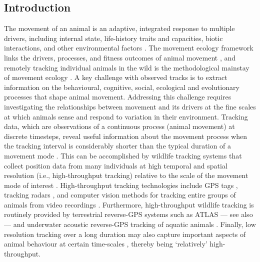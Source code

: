 \clearpage

\begin{refsection}
    \section{Introduction}
    The movement of an animal is an adaptive, integrated response to multiple drivers, including internal state, life-history traits and capacities, biotic interactions, and other environmental factors \cite{nathan2008a, holyoak2008}.
    The movement ecology framework links the drivers, processes, and fitness outcomes of animal movement \cite{nathan2008a}, and remotely tracking individual animals in the wild is the methodological mainstay of movement ecology \cite{wikelski2007,nathan2008a,hussey2015,kays2015}.
    A key challenge with observed tracks is to extract information on the behavioural, cognitive, social, ecological and evolutionary processes that shape animal movement.
    Addressing this challenge requires investigating the relationships between movement and its drivers at the fine scales at which animals sense and respond to variation in their environment. 
    Tracking data, which are observations of a continuous process (animal movement) at discrete timesteps, reveal useful information about the movement process when the tracking interval is considerably shorter than the typical duration of a movement mode \cite{nathan2008a, noonan2019, getz2008}.
    This can be accomplished by wildlife tracking systems that collect position data from many individuals at high temporal and spatial resolution (i.e., high-throughput tracking) relative to the scale of the movement mode of interest \cite{getz2008}.
    High-throughput tracking technologies include GPS tags \cite{strandburg-peshkin2015, papageorgiou2019, harel2016, klarevas-irby2021}, tracking radars \cite{horvitz2014}, and computer vision methods for tracking entire groups of animals from video recordings \cite{rathore2020, perez-escudero2014}. 
    Furthermore, high-throughput wildlife tracking is routinely provided by terrestrial reverse-GPS systems such as ATLAS \cite[Advanced Tracking and Localization of Animals in real-life Systems:][]{toledo2014, weiser2016, toledo2016,toledo2020} --- see also \cite{maccurdy2009, maccurdy2019} --- and underwater acoustic reverse-GPS tracking of aquatic animals \cite{baktoft2019, baktoft2017, jung2015, aspillaga2021, aspillaga2021a}.
    Finally, low resolution tracking over a long duration may also capture important aspects of animal behaviour at certain time-scales \cite[e.g. migration, long-range dispersal;][]{getz2008}, thereby being `relatively' high-throughput.


\end{refsection}
